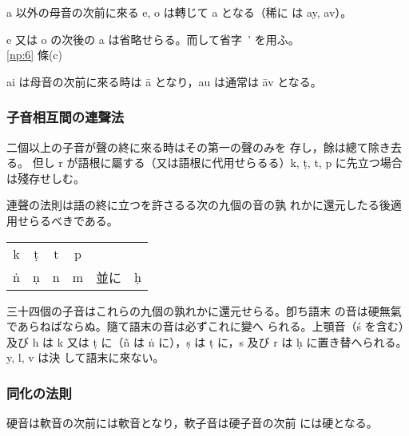 \numberParagraph \label{np:14}
a 以外の母音の次前に來る e, o は轉じて a となる（稀に
は ay, av）。

e 又は o の次後の a は省略せらる。而して省字 \,' を用ふ。\\
\hfill \ref{np:6} 條(c)

\numberParagraph
ai は母音の次前に來る時は ā となり，au は通常は āv となる。


\subsubsection{子音相互間の連聲法}
\numberParagraph
二個以上の子音が聲の終に來る時はその第一の聲のみを
存し，餘は總て除き去る。
但し r が語根に屬する（又は語根に代用せらるる）k, ṭ, t, p
に先立つ場合は殘存せしむ。

\numberParagraph \label{np:17}
連聲の法則は語の終に立つを許さるる次の九個の音の孰
れかに還元したる後適用せらるべきである。

\begin{center}
\begin{tabular}{cccccc}
  k & ṭ & t & p & & \\
  ṅ & ṇ & n & m & 並に & ḥ
\end{tabular}
\end{center}
三十四個の子音はこれらの九個の孰れかに還元せらる。卽ち語末
の音は硬無氣であらねばならぬ。隨て語末の音は必ずこれに變へ
られる。上顎音（ś を含む）及び h は k 又は ṭ に（ñ は ṅ
に），ṣ は ṭ に，s 及び r は ḥ に置き替へられる。y, l, v は決
して語末に來ない。

\subsubsection{同化の法則}
\numberParagraph
硬音は軟音の次前には軟音となり，軟子音は硬子音の次前
には硬となる。

